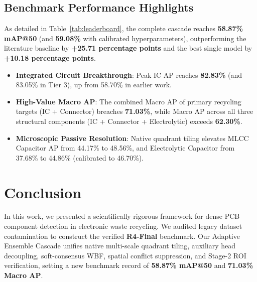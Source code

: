 \subsection{Benchmark Performance Highlights}
As detailed in Table~\ref{tab:leaderboard}, the complete cascade reaches \textbf{58.87\% mAP@50} (and \textbf{59.08\%} with calibrated hyperparameters), outperforming the literature baseline by \textbf{+25.71 percentage points} and the best single model by \textbf{+10.18 percentage points}.
\begin{itemize}
    \item \textbf{Integrated Circuit Breakthrough}: Peak IC AP reaches \textbf{82.83\%} (and 83.05\% in Tier 3), up from 58.70\% in earlier work.
    \item \textbf{High-Value Macro AP}: The combined Macro AP of primary recycling targets (IC + Connector) breaches \textbf{71.03\%}, while Macro AP across all three structural components (IC + Connector + Electrolytic) exceeds \textbf{62.30\%}.
    \item \textbf{Microscopic Passive Resolution}: Native quadrant tiling elevates MLCC Capacitor AP from 44.17\% to 48.56\%, and Electrolytic Capacitor from 37.68\% to 44.86\% (calibrated to 46.70\%).
\end{itemize}

\section{Conclusion}
\label{sec:conclusion}
In this work, we presented a scientifically rigorous framework for dense PCB component detection in electronic waste recycling. We audited legacy dataset contamination to construct the verified \textbf{R4-Final} benchmark. Our Adaptive Ensemble Cascade unifies native multi-scale quadrant tiling, auxiliary head decoupling, soft-consensus WBF, spatial conflict suppression, and Stage-2 ROI verification, setting a new benchmark record of \textbf{58.87\% mAP@50} and \textbf{71.03\% Macro AP}.
